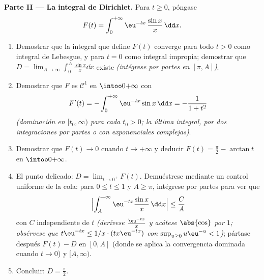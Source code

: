 \begin{problem}
\medskip
\noindent\textbf{Parte II --- La integral de Dirichlet.} Para $t
\geq 0$, póngase
\[
F(t) = \int_0^{+\infty}\eu^{-tx}\,\frac{\sin x}{x}\,\dd x .
\]
\begin{enumerate}[resume]
  \item Demostrar que la integral que define $F(t)$ converge para todo
  $t > 0$ como integral de Lebesgue, y para $t = 0$ como integral
  impropia; demostrar que $D =
        \lim_{A\to\infty}\int_0^A\frac{\sin x}x\dd x$ existe
  \emph{(intégrese por partes en $[\pi, A]$)}. \item Demostrar que $F$
  es $\mathcal C^1$ en $\intoo0{+\infty}$ con
        \[
        F'(t) = -\int_0^{+\infty}\eu^{-tx}\sin x\,\dd x
        = -\frac{1}{1 + t^2}
        \]
        \emph{(dominación en $[t_0, \infty)$ para cada $t_0 >
        0$; la última integral, por dos integraciones por partes o con
        exponenciales complejas)}. \item Demostrar que $F(t) \to 0$
        cuando $t \to +\infty$ y deducir $F(t)
        = \frac\pi2 - \arctan t$ en $\intoo0{+\infty}$. \item El punto
        delicado: $D = \lim_{t\to0^+}F(t)$. Demuéstrese mediante un
        control uniforme de la cola: para $0 \leq t \leq 1$ y
        $A \geq \pi$, intégrese por partes para ver que
        \[
        \Bigl|\int_A^{+\infty}\eu^{-tx}\frac{\sin
        x}x\,\dd x\Bigr| \leq \frac{C}{A}
        \]
        con $C$ independiente de $t$ \emph{(derívese $\frac{\eu^{-tx}}x$
        y acótese $\abs{\cos}$ por $1$; obsérvese que
        $t\eu^{-tx} \leq 1/x\cdot(tx\eu^{-tx})$ con
        $\sup_{u\geq0}u\eu^{-u} < 1$)}; pártase después $F(t) - D$ en
        $[0, A]$ (donde se aplica la convergencia dominada cuando
        $t \to 0$) y
        $[A, \infty)$.
  \item Concluir: $D = \frac\pi2$.
\end{enumerate}


\end{problem}
